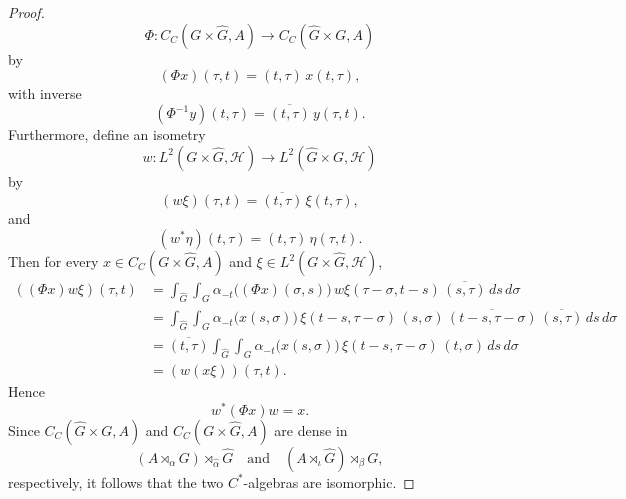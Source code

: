 \documentclass{book}
\begin{document}
\begin{proof}
  \[ \Phi:C_C(G\times\widehat G,A) \longrightarrow C_C(\widehat G\times G,A) \] by
  \[ (\Phi x)(\tau,t) = (t,\tau)\,x(t,\tau), \] with inverse
  \[ (\Phi^{-1}y)(t,\tau) = \overline{(t,\tau)}\,y(\tau,t). \]
  Furthermore, define an isometry 
  \[ w:L^2(G\times\widehat G,\mathcal H) \longrightarrow L^2(\widehat G\times G,\mathcal H) \] by
  \[ (w\xi)(\tau,t) = \overline{(t,\tau)}\,\xi(t,\tau), \] and 
  \[ (w^*\eta)(t,\tau) = (t,\tau)\,\eta(\tau,t). \] 
  Then for every \(x\in C_C(G\times\widehat G,A)\) and \(\xi\in L^2(G\times\widehat G,\mathcal H)\),
  \begin{align*} 
    ((\Phi x)w\xi)(\tau,t) &= \int_{\widehat G}\int_G \alpha_{-t}\bigl((\Phi x)(\sigma,s)\bigr) \,w\xi(\tau-\sigma,t-s) \,\overline{(s,\tau)} \,ds\,d\sigma \\
    &= \int_{\widehat G}\int_G \alpha_{-t}\bigl(x(s,\sigma)\bigr) \,\xi(t-s,\tau-\sigma)\, (s,\sigma)\, \overline{(t-s,\tau-\sigma)}\, \overline{(s,\tau)} \,ds\,d\sigma \\
    &= \overline{(t,\tau)} \int_{\widehat G}\int_G \alpha_{-t}\bigl(x(s,\sigma)\bigr) \,\xi(t-s,\tau-\sigma)\, (t,\sigma) \,ds\,d\sigma \\
    &= (w(x\xi))(\tau,t). 
  \end{align*}
  Hence \[ w^*(\Phi x)w=x. \] Since \(C_C(\widehat G\times G,A)\) and \(C_C(G\times\widehat G,A)\) are dense in
  \[ (A\rtimes_\alpha G)\rtimes_{\hat\alpha}\widehat G \quad\text{and}\quad (A\rtimes_\iota\widehat G)\rtimes_\beta G, \]
  respectively, it follows that the two \(C^*\)-algebras are isomorphic. 
\end{proof}
\end{document}
